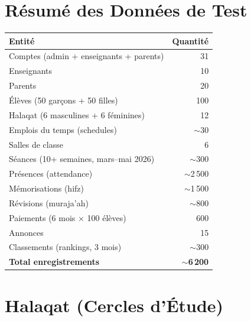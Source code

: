 \documentclass[a4paper,11pt]{article}
\begin{document}
\vspace{0.5cm}

\section*{Résumé des Données de Test}

\begin{tabularx}{\textwidth}{X r}
    \toprule
    \textbf{Entité} & \textbf{Quantité} \\
    \midrule
    Comptes (admin + enseignants + parents)  & 31 \\
    Enseignants                              & 10 \\
    Parents                                  & 20 \\
    Élèves (50 garçons + 50 filles)          & 100 \\
    Halaqat (6 masculines + 6 féminines)     & 12 \\
    Emplois du temps (schedules)             & $\sim$30 \\
    Salles de classe                         & 6 \\
    Séances (10+ semaines, mars--mai 2026)   & $\sim$300 \\
    Présences (attendance)                   & $\sim$2\,500 \\
    Mémorisations (hifz)                     & $\sim$1\,500 \\
    Révisions (muraja'ah)                    & $\sim$800 \\
    Paiements (6 mois × 100 élèves)         & 600 \\
    Annonces                                 & 15 \\
    Classements (rankings, 3 mois)           & $\sim$300 \\
    \midrule
    \textbf{Total enregistrements}           & $\sim$\textbf{6\,200} \\
    \bottomrule
\end{tabularx}

\vspace{0.5cm}

\section*{Halaqat (Cercles d'Étude)}
\end{document}
